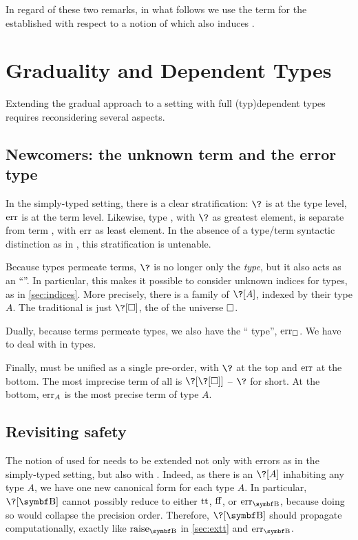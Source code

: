 \AP In regard of these two remarks, in what follows we use the term 
for the  established with respect to a notion of  which also
induces .

\section{Graduality and Dependent Types}
\label{sec:graduality}

Extending the gradual approach to a setting with full \kl(typ){dependent} types
requires reconsidering several aspects.

\subsection{Newcomers: the unknown term and the error type}
%
In the simply-typed setting, there is a clear stratification: $\?$ is at the type level,
$\err$ is at the term level. Likewise, type , with $\?$ as greatest element,
is separate from term , with $\err$ as least element.
In the absence of a type/term syntactic distinction as in ,
this stratification is untenable.

Because types permeate terms, $\?$ is no longer only the  \emph{type},
but it also acts as an “”.
In particular, this makes it possible to consider unknown indices for types,
as in \cref{sec:indices}.
More precisely, there is a family of  $\?[A]$, indexed by their type $A$.
The traditional  is just $\?[\uni]$, the  of the universe $\uni$.

Dually, because terms permeate types, we also have the “ type”, $\err[\uni]$.
We have to deal with  in types.

Finally,  must be unified as a single pre-order, with $\?$ at the top
and $\err$ at the bottom.
The most imprecise term of all%
is $\?[\?[\uni]]$ – $\?$ for short. At the bottom, $\err[A]$
is the most precise term of type $A$.

\subsection{Revisiting safety}

The notion of  used for  needs to be extended not
only with errors as in the simply-typed setting, but also with .
Indeed, as there is an  $\?[A]$ inhabiting any type
$A$, we have one new canonical form for each type $A$. In particular,
$\?[\Bool]$ cannot possibly reduce to either $\operatorname{tt}$, $\operatorname{ff}$, or $\err[\Bool]$,
because doing so would collapse the precision order.
%
Therefore, $\?[\Bool]$ should propagate computationally, exactly
like $\rai[\Bool]$ in \cref{sec:extt} and $\err[\Bool]$.
%

